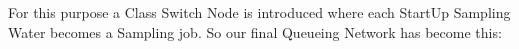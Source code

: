 \begin{center}
\end{center}
\bigskip
{}
\bigskip

For this purpose a Class Switch Node is introduced where each StartUp Sampling Water becomes a Sampling job.
So our final Queueing Network has become this:
 
\bigskip
\begin{center}
\end{center}
\bigskip
{}



